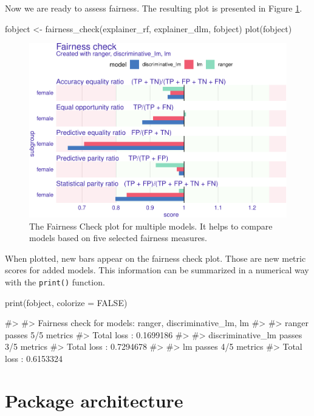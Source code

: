 Now we are ready to assess fairness. The resulting plot is presented in
Figure \ref{fig:fairness-plot-3}.

\begin{Schunk}
\begin{Sinput}
fobject <- fairness_check(explainer_rf, explainer_dlm, fobject)
plot(fobject)
\end{Sinput}
\begin{figure}

{\centering \includegraphics[width=0.75\linewidth]{Wisniewski-Biecek_files/figure-latex/fairness-plot-3-1} 

}

\caption[The Fairness Check plot for multiple models]{The Fairness Check plot for multiple models. It helps to compare models based on five selected fairness measures. }\label{fig:fairness-plot-3}
\end{figure}
\end{Schunk}

When plotted, new bars appear on the fairness check plot. Those are new
metric scores for added models. This information can be summarized in a
numerical way with the \texttt{print()} function.

\begin{Schunk}
\begin{Sinput}
print(fobject, colorize = FALSE)
\end{Sinput}
\begin{Soutput}
#> 
#> Fairness check for models: ranger, discriminative_lm, lm 
#> 
#> ranger passes 5/5 metrics
#> Total loss :  0.1699186 
#> 
#> discriminative_lm passes 3/5 metrics
#> Total loss :  0.7294678 
#> 
#> lm passes 4/5 metrics
#> Total loss :  0.6153324
\end{Soutput}
\end{Schunk}

\hypertarget{package-architecture}{%
\section{Package architecture}\label{package-architecture}}

